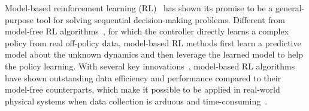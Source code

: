 \documentclass{article} %
\begin{document}
Model-based reinforcement learning (RL)~\citep{janner2019trust,yu2020mopo,schrittwieser2020mastering,hafner2021mastering} has shown its promise to be a general-purpose tool for solving sequential decision-making problems. 
Different from model-free RL algorithms~\citep{mnih2015human,haarnoja2018soft}, for which the controller directly learns a complex policy from real off-policy data, model-based RL methods first learn a predictive model about the unknown dynamics  and then leverage the learned model to help the policy learning. 
With several key innovations~\citep{janner2019trust,clavera_model-augmented_2019}, model-based RL algorithms have shown outstanding data efficiency and performance compared to their model-free counterparts, which make it possible to be applied in real-world physical systems when data collection is arduous and time-consuming~\citep{moerland2020model}.

\end{document}

